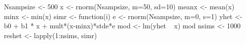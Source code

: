 \begin{Schunk}
\begin{Sinput}
 Nsampsize <- 500
 x <- rnorm(Nsampsize, m=50, sd=10)
 meanx <- mean(x)
 minx <- min(x)
 simr <- function(i){
  e <- rnorm(Nsampsize, m=0, s=1)
  yhet <- b0 + b1 * x + mult*(x-minx)*stde*e
  mod <- lm(yhet ~ x)
  mod
  }
 nsims <- 1000
 reshet <- lapply(1:nsims, simr)
\end{Sinput}
\end{Schunk}
